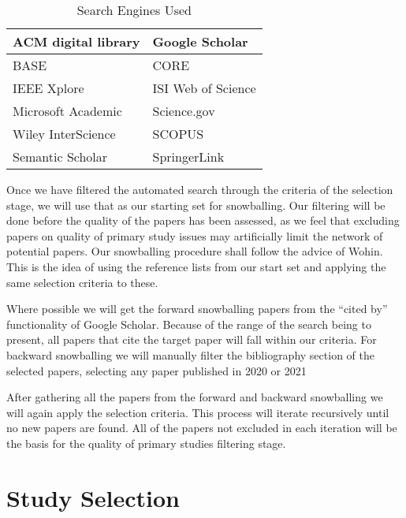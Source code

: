 \begin{table}[H]
    \begin{center}         
        \begin{tabular}{|l||l|}
            \hline
            ACM digital library       & Google Scholar       \\
            \hline
            BASE                      & CORE                 \\
            \hline  
            IEEE Xplore               & ISI Web of Science   \\
            \hline  
            Microsoft Academic        & Science.gov          \\
            \hline  
            Wiley InterScience        & SCOPUS               \\
            \hline  
            Semantic Scholar          & SpringerLink         \\
            \hline  
        \end{tabular}
    \end{center}
    \caption{Search Engines Used}
    \label{table:searchEngines}
\end{table}

Once we have filtered the automated search through the criteria of the selection stage, we will use that as our starting set for snowballing.
Our filtering will be done before the quality of the papers has been assessed, as we feel that excluding papers on quality of primary study issues may artificially limit the network of potential papers.
Our snowballing procedure shall follow the advice of Wohin\cite{Wohlin_2014}.
This is the idea of using the reference lists from our start set and applying the same selection criteria to these.  

Where possible we will get the forward snowballing papers from the ``cited by'' functionality of Google Scholar.
Because of the range of the search being to present, all papers that cite the target paper will fall within our criteria.
For backward snowballing we will manually filter the bibliography section of the selected papers, selecting any paper published in 2020 or 2021

After gathering all the papers from the forward and backward snowballing we will again apply the selection criteria.
This process will iterate recursively until no new papers are found.  
All of the papers not excluded in each iteration will be the basis for the quality of primary studies filtering stage.

\section{Study Selection}

